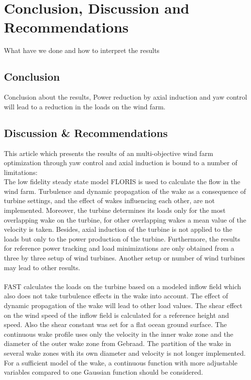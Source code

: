 \section{Conclusion, Discussion and Recommendations}
What have we done and how to interpret the results
\subsection{Conclusion}
Conclusion about the results, Power reduction by axial  induction and yaw control will lead to a reduction in the loads on the wind farm. 
 

\subsection{Discussion \& Recommendations}
This article which presents the results of an multi-objective wind farm optimization through yaw control and axial induction is bound to a number of limitations:
\newline
\\
The low fidelity steady state model FLORIS is used to calculate the flow in the wind farm. Turbulence and dynamic propagation of the wake as a consequence of turbine settings, and the effect of wakes influencing each other, are not implemented. Moreover, the  turbine determines its loads only for the most overlapping wake on the turbine, for other overlapping wakes a mean value of the velocity is taken. Besides, axial induction of the turbine is not applied to the loads but only to the power production of the turbine. 
Furthermore, the results for reference power tracking and load minimizations are only obtained from a three by three setup of wind turbines. Another setup or number of wind turbines may lead to other results. 
\\\\
FAST calculates the loads on the turbine based on a modeled inflow field which also does not take turbulence effects in the wake into account. The effect of dynamic propagation of the wake will lead to other load values. The shear effect on the wind speed of the inflow field is calculated for a reference height and  speed. Also the shear constant was set for a flat ocean ground surface.
\newline 
The continuous wake profile uses only the velocity in the inner wake zone and the diameter of the outer wake zone from Gebraad. \cite{Gebraad2016} The partition of the wake in several wake zones with its own diameter and velocity is not longer implemented. For a sufficient model of the wake, a continuous function with more adjustable variables compared to one Gaussian function should be considered.  

